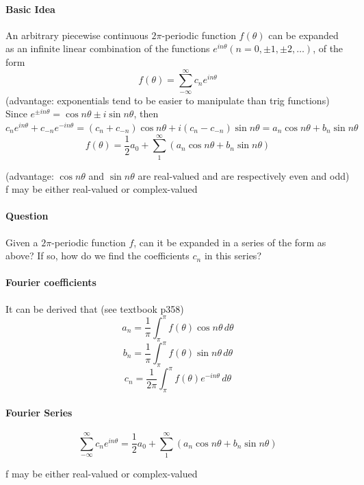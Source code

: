 \documentclass[11pt]{article}
\begin{document}
\paragraph{Basic Idea} An arbitrary piecewise continuous $2\pi$-periodic function $f(\theta)$ can be expanded as an infinite linear combination of the functions $e^{in\theta}(n = 0,\pm 1, \pm 2,\hdots)$, of the form
$$f(\theta) = \sum_{-\infty}^{\infty}c_ne^{in\theta}$$
(advantage: exponentials tend to be easier to manipulate than trig functions)\\
Since $e^{\pm in\theta} = \cos n\theta \pm i \sin n \theta$, then $c_ne^{in\theta} + c_{-n}e^{-in\theta} = (c_n + c_{-n})\cos n \theta + i(c_n - c_{-n}) \sin n\theta = a_n\cos n \theta + b_n \sin n\theta$
$$f(\theta) = \frac{1}{2}a_0 + \sum_1^\infty(a_n\cos n\theta+b_n \sin n\theta)$$

\noindent (advantage: $\cos n\theta$ and $\sin n\theta$ are real-valued and are respectively even and odd)\\
f may be either real-valued or complex-valued\\
\paragraph{Question}
Given a $2\pi$-periodic function $f$, can it be expanded in a series of the form as above? If so, how do we find the coefficients $c_n$ in this series?
\paragraph{Fourier coefficients}
It can be derived that (see textbook p358)
$$a_n = \frac{1}{\pi}\int_\pi^\pi f(\theta)\cos n\theta \, d\theta$$
$$b_n = \frac{1}{\pi}\int_\pi^\pi f(\theta)\sin n\theta \, d\theta$$
$$c_n = \frac{1}{2\pi}\int_\pi^\pi f(\theta)e^{-in\theta} \, d\theta$$
\paragraph{Fourier Series}
$$\sum_{-\infty}^{\infty} c_n e^{in\theta} = \frac{1}{2}a_0 + \sum_1^\infty(a_n\cos n\theta + b_n \sin n\theta)$$

f may be either real-valued or complex-valued
\end{document}

